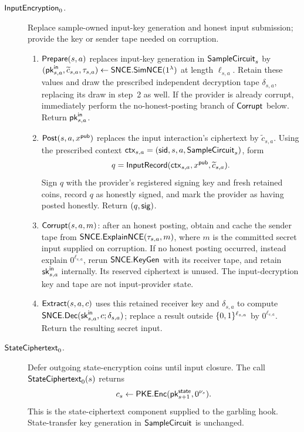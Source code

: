 \begin{description}
\item[$\mathsf{InputEncryption}_0$.]\label{hook:input-encryption}
 Replace sample-owned input-key generation and honest input submission;
 provide the key or sender tape needed on corruption.
 \begin{enumerate}
 \item $\mathsf{Prepare}(s,a)$ replaces input-key generation in
   $\mathsf{SampleCircuit}_s$ by
   $(\mathsf{pk}^{\mathsf{in}}_{s,a},\widetilde c_{s,a},\tau_{s,a})
      \mathrel{\leftarrow}\mathsf{SNCE}.\mathsf{SimNCE}(1^\lambda)$ at length $\ell_{s,a}$.
   Retain these values and draw the prescribed independent decryption
   tape $\delta_{s,a}$, replacing its draw in step~2 as well.  If the provider is already corrupt, immediately
   perform the no-honest-posting branch of $\mathsf{Corrupt}$ below.  Return
   $\mathsf{pk}^{\mathsf{in}}_{s,a}$.
 \item $\mathsf{Post}(s,a,x^{\mathsf{pub}})$ replaces the input interaction's ciphertext
   by $\widetilde c_{s,a}$.  Using the prescribed context
   $\mathsf{ctx}_{s,a}=(\mathsf{sid},s,a,\mathsf{SampleCircuit}_s)$, form
   \[
     q=\mathsf{InputRecord}(\mathsf{ctx}_{s,a},x^{\mathsf{pub}},\widetilde c_{s,a}).
   \]
   Sign $q$ with the provider's registered signing key and fresh retained
   coins, record $q$ as honestly signed, and mark the provider as having
   posted honestly.  Return $(q,\mathsf{sig})$.
 \item $\mathsf{Corrupt}(s,a,m)$: after an honest posting, obtain and cache
   the sender tape from $\mathsf{SNCE}.\mathsf{ExplainNCE}(\tau_{s,a},m)$, where $m$
   is the committed secret input supplied on corruption.  If no honest
   posting occurred, instead explain $0^{\ell_{s,a}}$, rerun
   $\mathsf{SNCE}.\mathsf{KeyGen}$ with its receiver tape, and retain
   $\mathsf{sk}^{\mathsf{in}}_{s,a}$ internally.  Its reserved ciphertext is unused.
   The input-decryption key and tape are not input-provider state.
 \item $\mathsf{Extract}(s,a,c)$ uses this retained receiver key and
   $\delta_{s,a}$ to compute $\mathsf{SNCE}.\mathsf{Dec}(\mathsf{sk}^{\mathsf{in}}_{s,a},c;\delta_{s,a})$;
   replace a result outside $\{0,1\}^{\ell_{s,a}}$ by $0^{\ell_{s,a}}$.
   Return the resulting secret input.
 \end{enumerate}

\item[$\mathsf{StateCiphertext}_0$.]\label{hook:state-ciphertext}
 Defer outgoing state-encryption coins until input closure.
 The call $\mathsf{StateCiphertext}_0(s)$ returns
 \[
   c_s\mathrel{\leftarrow}\mathsf{PKE}.\mathsf{Enc}(\mathsf{pk}^{\mathsf{state}}_{s+1},0^{\nu_s}).
 \]
 This is the state-ciphertext component supplied to the garbling hook.
 State-transfer key generation in $\mathsf{SampleCircuit}$ is unchanged.


\end{description}
